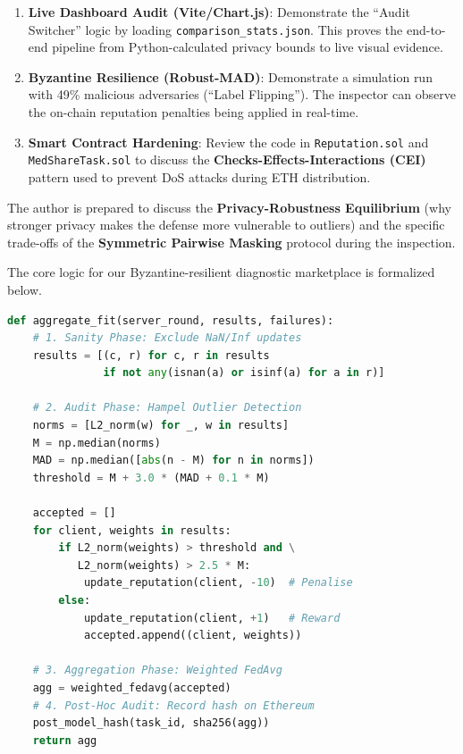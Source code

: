 \documentclass[10pt, a4paper, twocolumn]{article}
\begin{document}
\begin{enumerate}
    \item \textbf{Live Dashboard Audit (Vite/Chart.js)}: Demonstrate the ``Audit Switcher'' logic by loading \texttt{comparison\_stats.json}. This proves the end-to-end pipeline from Python-calculated privacy bounds to live visual evidence.
    \item \textbf{Byzantine Resilience (Robust-MAD)}: Demonstrate a simulation run with 49\% malicious adversaries (``Label Flipping''). The inspector can observe the on-chain reputation penalties being applied in real-time.
    \item \textbf{Smart Contract Hardening}: Review the code in \texttt{Reputation.sol} and \texttt{MedShareTask.sol} to discuss the \textbf{Checks-Effects-Interactions (CEI)} pattern used to prevent DoS attacks during ETH distribution.
\end{enumerate}

The author is prepared to discuss the \textbf{Privacy-Robustness Equilibrium} (why stronger privacy makes the defense more vulnerable to outliers) and the specific trade-offs of the \textbf{Symmetric Pairwise Masking} protocol during the inspection.

The core logic for our Byzantine-resilient diagnostic marketplace is formalized below.

\begin{lstlisting}[language=Python, caption={MedShare-FL Aggregation Algorithm}]
def aggregate_fit(server_round, results, failures):
    # 1. Sanity Phase: Exclude NaN/Inf updates
    results = [(c, r) for c, r in results
               if not any(isnan(a) or isinf(a) for a in r)]
    
    # 2. Audit Phase: Hampel Outlier Detection
    norms = [L2_norm(w) for _, w in results]
    M = np.median(norms)
    MAD = np.median([abs(n - M) for n in norms])
    threshold = M + 3.0 * (MAD + 0.1 * M)
    
    accepted = []
    for client, weights in results:
        if L2_norm(weights) > threshold and \
           L2_norm(weights) > 2.5 * M:
            update_reputation(client, -10)  # Penalise
        else:
            update_reputation(client, +1)   # Reward
            accepted.append((client, weights))
    
    # 3. Aggregation Phase: Weighted FedAvg
    agg = weighted_fedavg(accepted)
    # 4. Post-Hoc Audit: Record hash on Ethereum
    post_model_hash(task_id, sha256(agg))
    return agg
\end{lstlisting}
\end{document}
